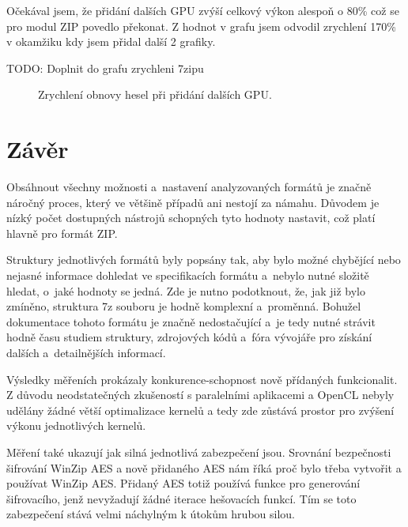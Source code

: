 Očekával jsem, že přidání dalších GPU zvýší celkový výkon alespoň o 80\% což se pro modul ZIP
povedlo překonat. Z hodnot v grafu jsem odvodil zrychlení 170\% v okamžiku kdy jsem přidal další
2 grafiky.

TODO: Doplnit do grafu zrychleni 7zipu
\begin{center}
    \begin{figure}[ht]
	\caption{Zrychlení obnovy hesel při přidání dalších GPU.}
	\label{memory}
    \end{figure}
\end{center}

\chapter{Závěr}
Obsáhnout všechny možnosti a~nastavení analyzovaných formátů je značně náročný proces, který
ve většině případů ani nestojí za námahu. Důvodem je nízký počet dostupných nástrojů schopných
tyto hodnoty nastavit, což platí hlavně pro formát ZIP.

 Struktury jednotlivých formátů byly popsány tak, aby bylo možné chybějící nebo nejasné informace
dohledat ve specifikacích formátu a~nebylo nutné složitě hledat, o~jaké hodnoty se jedná. Zde
je nutno podotknout, že, jak již bylo zmíněno, struktura 7z souboru je hodně komplexní a~proměnná.
Bohužel dokumentace tohoto formátu je značně nedostačující a~je tedy nutné strávit hodně času
studiem struktury, zdrojových kódů a~fóra vývojáře pro získání dalších a~detailnějších informací.

 Výsledky měřeních prokázaly konkurence-schopnost nově přídaných funkcionalit. Z důvodu
neodstatečných zkušeností s paralelními aplikacemi a OpenCL nebyly udělány žádné větší
optimalizace kernelů a tedy zde zůstává prostor pro zvýšení výkonu jednotlivých kernelů. 

 Měření také ukazují jak silná jednotlivá zabezpečení jsou. Srovnání bezpečnosti šifrování
WinZip AES a nově přidaného AES nám říká proč bylo třeba vytvořit a používat WinZip AES. Přidaný
AES totiž používá funkce pro generování šifrovacího, jenž nevyžadují žádné iterace hešovacích
funkcí. Tím se toto zabezpečení stává velmi náchylným k útokům hrubou silou.

